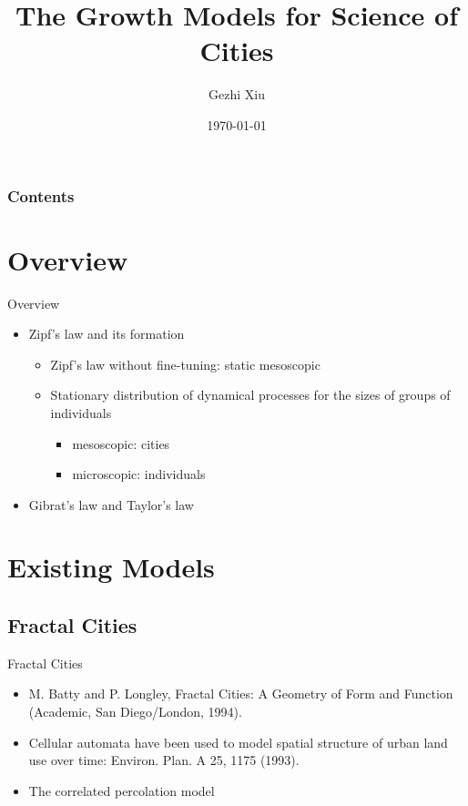 \documentclass{beamer}
\title[Growth Models]{The Growth Models for Science of Cities}
\author[G. Xiu]{Gezhi Xiu} %
\institute[IRSGIS PKU]{Complexity Research Group,\\Peking University}
\date[\today]{\today}
\begin{document}
\maketitle
\begin{frame} \frametitle{Contents}
\tableofcontents
\end{frame}
\section{Overview}
\begin{frame}{Overview}
  \begin{itemize}
    \item Zipf's law and its formation
    \begin{itemize}
      \item Zipf's law without fine-tuning: static mesoscopic
      \item Stationary distribution of dynamical processes for the sizes of groups of individuals
      \begin{itemize}
        \item mesoscopic: cities
        \item microscopic: individuals
      \end{itemize}
    \end{itemize}
    \item Gibrat's law and Taylor's law
  \end{itemize}
\end{frame}

\section{Existing Models}

\subsection{Fractal Cities}

\begin{frame}{Fractal Cities}
  \begin{itemize}
    \item M. Batty and P. Longley, Fractal Cities: A Geometry of Form
    and Function (Academic, San Diego/London, 1994).
    \item Cellular automata have been used to model spatial structure of urban land use over time: Environ. Plan. A 25, 1175 (1993).
    \item The correlated percolation model
    
  \end{itemize}
\end{frame}
\end{document}
